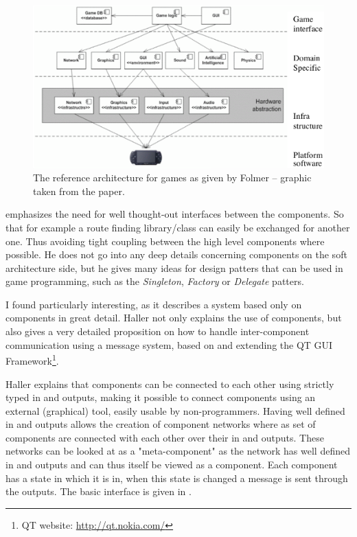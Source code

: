 \begin{figure}[!htb]
\center
\includegraphics[scale=0.3]{pics/referencearch}
\caption{The reference architecture for games as given by Folmer -- graphic taken from the paper.}
\label{fig:referencearch}
\end{figure}

\cite{Rollings.2003} emphasizes the need for well thought-out interfaces between the components. So that for example a
route finding library/class can easily be exchanged for another one. Thus avoiding tight coupling between the high
level components where possible. He does not go into any deep details concerning components on the soft architecture
side, but he gives many ideas for design patters that can be used in game programming, such as the \textit{Singleton},
\textit{Factory} or \textit{Delegate} patters.
\linebreak

I found \citet{Fh02ageneric} particularly interesting, as it describes a system based only on components in great
detail. Haller not only explains the use of components, but also gives a very detailed proposition on how to handle
inter-component communication using a message system, based on and extending the QT GUI Framework\footnote{QT website:
\url{http://qt.nokia.com/}}.

Haller explains that components can be connected to each other using strictly typed in and outputs, making it possible to connect components
using an external (graphical) tool, easily usable by non-programmers. Having well defined in and outputs allows the
creation of component networks where as set of components are connected with each other over their in and
outputs. These networks can be looked at as a "meta-component" as the network has well defined in and outputs and can
thus itself be viewed as a component. Each component has a state in which it is in, when this state is changed a message
is sent through the outputs. The basic interface is given in .

